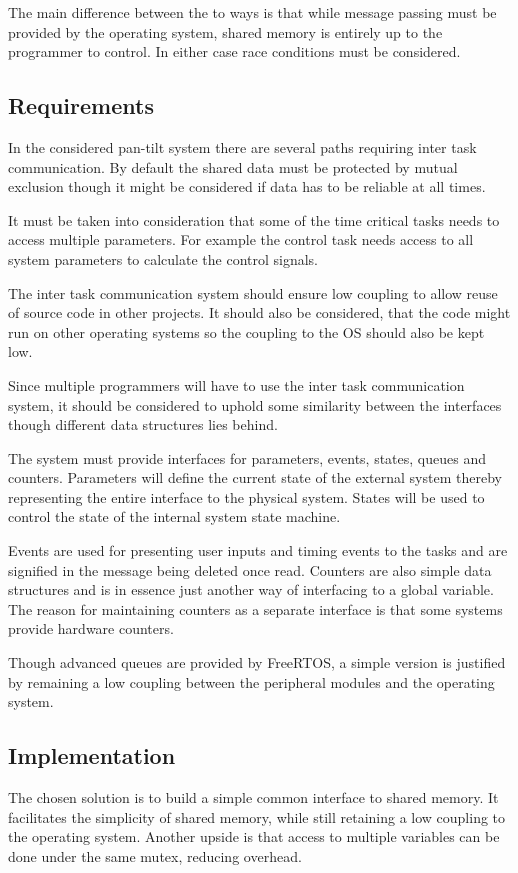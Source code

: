 The main difference between the to ways is that while message passing must be
provided by the operating system, shared memory is entirely up to the programmer
to control. In either case race conditions must be considered.

\subsection{Requirements}
In the considered pan-tilt system there are several paths requiring inter task
communication. By default the shared data must be protected by mutual exclusion
though it might be considered if data has to be reliable at all times. 

 It must be taken into consideration that some of the time critical tasks needs
 to access multiple parameters. For example the control task needs access to all
 system parameters to calculate the control signals.
 
 The inter task communication system should ensure low coupling to allow reuse
 of source code in other projects. It should also be considered, that the code
 might run on other operating systems so the coupling to the OS should also be kept
 low.
 
 Since multiple programmers will have to use the inter task communication
 system, it should be considered to uphold some similarity between the
 interfaces though different data structures lies behind.
 
 The system must provide interfaces for parameters, events, states, queues
and counters. Parameters will define the current state of the external system
thereby representing the entire interface to the physical system. States will be
used to control the state of the internal system state machine.

Events are used for presenting user inputs and timing events to the tasks and
are signified in the message being deleted once read. Counters are also simple
data structures and is in essence just another way of interfacing to a global
variable. The reason for maintaining counters as a separate interface is that
some systems provide hardware counters.

Though advanced queues are provided by FreeRTOS, a simple version is justified by
remaining a low coupling between the peripheral modules and the operating
system.

\subsection{Implementation}
The chosen solution is to build a simple common interface to shared memory. It
facilitates the simplicity of shared memory, while still retaining a low
coupling to the operating system. Another upside is that access to multiple
variables can be done under the same mutex, reducing overhead.

